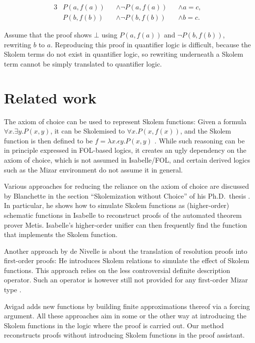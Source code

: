 \documentclass[]{article}
\begin{document}
\begin{alignat*}{3}
& P(a, f(a)) && \land \lnot P(a, f(a)) && \land a = c, \\
& P(b, f(b)) && \land \lnot P(b, f(b)) && \land b = c.
\end{alignat*}

Assume that the proof shows \(\bot\) using \(P(a, f(a))\) and
\(\lnot P(b, f(b))\), rewriting \(b\) to \(a\). Reproducing this proof
in quantifier logic is difficult, because the Skolem terms do not exist
in quantifier logic, so rewriting underneath a Skolem term cannot be
simply translated to quantifier logic.

\section{Related work}\label{related-work}

The axiom of choice can be used to represent Skolem functions: Given a
formula \(\forall x. \exists y. P(x, y)\), it can be Skolemised to
\(\forall x. P(x, f(x))\), and the Skolem function is then defined to be
\(f = \lambda x. \epsilon y. P(x, y)\) \citep{hilbert1939-mathematik}.
While such reasoning can be in principle expressed in FOL-based logics,
it creates an ugly dependency on the axiom of choice, which is not
assumed in Isabelle/FOL, and certain derived logics such as the Mizar
environment do not assume it in general.

Various approaches for reducing the reliance on the axiom of choice are
discussed by Blanchette in the section ``Skolemization without Choice''
of his Ph.D.~thesis \citep{blanchette2012-thesis}. In particular, he
shows how to simulate Skolem functions as (higher-order) schematic
functions in Isabelle to reconstruct proofs of the automated theorem
prover Metis. Isabelle's higher-order unifier can then frequently find
the function that implements the Skolem function.

Another approach by de Nivelle \citep{nivelle2005-translation} is about
the translation of resolution proofs into first-order proofs: He
introduces Skolem relations to simulate the effect of Skolem functions.
This approach relies on the less controversial definite description
operator. Such an operator is however still not provided for any
first-order Mizar type \citep{kaliszyk2016-misabelle}.

Avigad \citep{avigad2003-skolem} adds new functions by building finite
approximations thereof via a forcing argument. All these approaches aim
in some or the other way at introducing the Skolem functions in the
logic where the proof is carried out. Our method reconstructs proofs
without introducing Skolem functions in the proof assistant.
\end{document}
